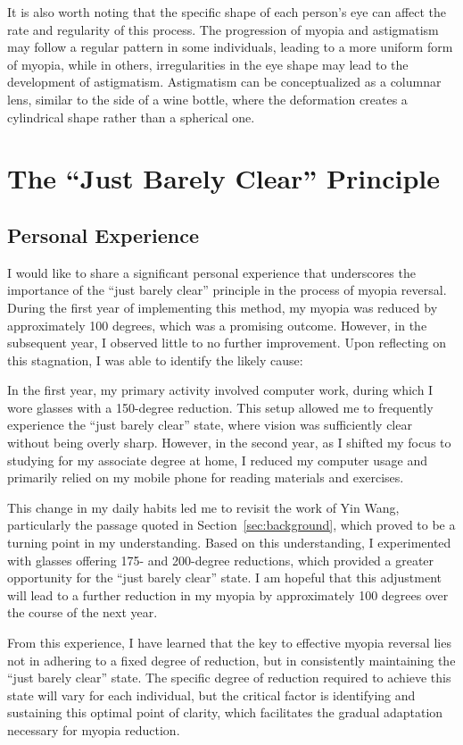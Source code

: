 \documentclass[12pt]{article}
\begin{document}
It is also worth noting that the specific shape of each person's eye can affect the rate and regularity of this process. The progression of myopia and astigmatism may follow a regular pattern in some individuals, leading to a more uniform form of myopia, while in others, irregularities in the eye shape may lead to the development of astigmatism. Astigmatism can be conceptualized as a columnar lens, similar to the side of a wine bottle, where the deformation creates a cylindrical shape rather than a spherical one.

\section{The ``Just Barely Clear'' Principle}

\subsection{Personal Experience}
I would like to share a significant personal experience that underscores the importance of the ``just barely clear'' principle in the process of myopia reversal. During the first year of implementing this method, my myopia was reduced by approximately 100 degrees, which was a promising outcome. However, in the subsequent year, I observed little to no further improvement. Upon reflecting on this stagnation, I was able to identify the likely cause:

In the first year, my primary activity involved computer work, during which I wore glasses with a 150-degree reduction. This setup allowed me to frequently experience the ``just barely clear'' state, where vision was sufficiently clear without being overly sharp. However, in the second year, as I shifted my focus to studying for my associate degree at home, I reduced my computer usage and primarily relied on my mobile phone for reading materials and exercises.

This change in my daily habits led me to revisit the work of Yin Wang, particularly the passage quoted in Section~\ref{sec:background}, which proved to be a turning point in my understanding. Based on this understanding, I experimented with glasses offering 175- and 200-degree reductions, which provided a greater opportunity for the ``just barely clear'' state. I am hopeful that this adjustment will lead to a further reduction in my myopia by approximately 100 degrees over the course of the next year.

From this experience, I have learned that the key to effective myopia reversal lies not in adhering to a fixed degree of reduction, but in consistently maintaining the ``just barely clear'' state. The specific degree of reduction required to achieve this state will vary for each individual, but the critical factor is identifying and sustaining this optimal point of clarity, which facilitates the gradual adaptation necessary for myopia reduction.
\end{document}

